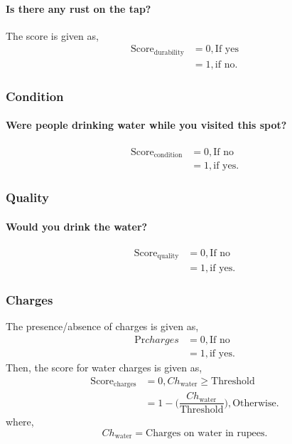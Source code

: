 \documentclass[oneside,twocolumn]{article}
\newcommand{\tsub}[2]{\text{#1}_{\text{#2}}}
\newcommand{\tsubb}[2]{#1_{\text{#2}}}
\begin{document}
\paragraph{Is there any rust on the tap?}
The score is given as,
\begin{align*}
	\tsub{Score}{durability} &= 0, \text{If yes} \\
	&= 1, \text{if no}.
\end{align*}
\subsubsection{Condition}
\paragraph{Were people drinking water while you visited this spot?}
\begin{align*}
	\tsub{Score}{condition} &= 0, \text{If no} \\
	&= 1, \text{if yes}.
\end{align*}

\subsubsection{Quality}
\paragraph{Would you drink the water?}
\begin{align*}
	\tsub{Score}{quality} &= 0, \text{If no} \\
	&= 1, \text{if yes}.
\end{align*}

\subsubsection{Charges}
The presence/absence of charges is given as,
\begin{align*}
	\text{Pr}{charges} &= 0, \text{If no} \\
	&= 1, \text{if yes}.
\end{align*}
Then, the score for water charges is given as,
\begin{align*}
	\tsub{Score}{charges} &= 0, \tsubb{Ch}{water} \ge \text{Threshold} \\
	&= 1 - \Big( \dfrac{\tsubb{Ch}{water}}{\text{Threshold}} \Big), \text{Otherwise}.
\end{align*}
where,
\[
	\tsubb{Ch}{water} = \text{Charges on water in rupees}.
\]
\end{document}

